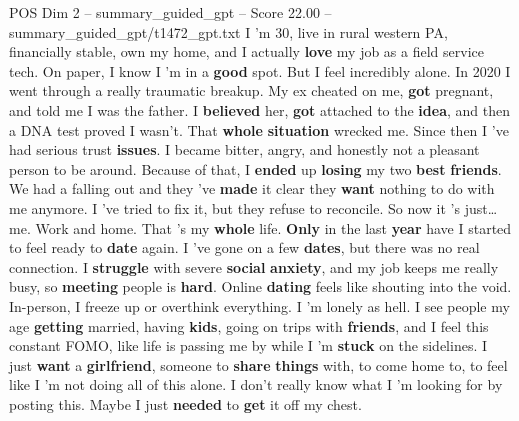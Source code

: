 \begin{textsample}{POS Dim 2 – summary\_guided\_gpt – Score 22.00 – summary\_guided\_gpt/t1472\_gpt.txt}  \label{ex:f2_pos_020}
I ’m 30, live in rural western PA, financially stable, own my home, and I actually \textbf{love} my job as a field service tech.
On paper, I know I ’m in a \textbf{good} spot.
But I feel incredibly alone.
In 2020 I went through a really traumatic breakup.
My ex cheated on me, \textbf{got} pregnant, and told me I was the father.
I \textbf{believed} her, \textbf{got} attached to the \textbf{idea}, and then a DNA test proved I wasn't.
That \textbf{whole} \textbf{situation} wrecked me.
Since then I ’ve had serious trust \textbf{issues}.
I became bitter, angry, and honestly not a pleasant person to be around.
Because of that, I \textbf{ended} up \textbf{losing} my two \textbf{best} \textbf{friends}.
We had a falling out and they ’ve \textbf{made} it clear they \textbf{want} nothing to do with me anymore.
I ’ve tried to fix it, but they refuse to reconcile.
So now it ’s just…me.
Work and home.
That ’s my \textbf{whole} life. \textbf{Only} in the last \textbf{year} have I started to feel ready to \textbf{date} again.
I ’ve gone on a few \textbf{dates}, but there was no real connection.
I \textbf{struggle} with severe \textbf{social} \textbf{anxiety}, and my job keeps me really busy, so \textbf{meeting} people is \textbf{hard}.
Online \textbf{dating} feels like shouting into the void.
In-person, I freeze up or overthink everything.
I ’m lonely as hell.
I see people my age \textbf{getting} married, having \textbf{kids}, going on trips with \textbf{friends}, and I feel this constant FOMO, like life is passing me by while I ’m \textbf{stuck} on the sidelines.
I just \textbf{want} a \textbf{girlfriend}, someone to \textbf{share} \textbf{things} with, to come home to, to feel like I ’m not doing all of this alone.
I don't really know what I ’m looking for by posting this.
Maybe I just \textbf{needed} to \textbf{get} it off my chest.

\end{textsample}
